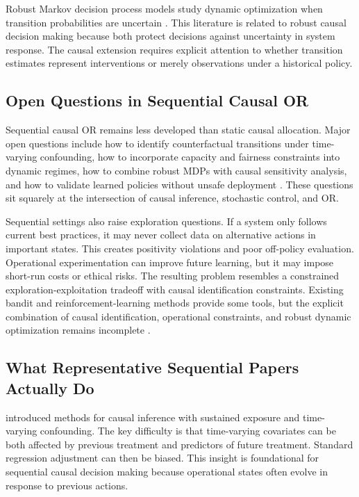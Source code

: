 \documentclass[11pt]{article}
\begin{document}
Robust Markov decision process models study dynamic optimization when transition probabilities are uncertain \citep{iyengar2005robust,nilim2005robust,wiesemann2013robust}. This literature is related to robust causal decision making because both protect decisions against uncertainty in system response. The causal extension requires explicit attention to whether transition estimates represent interventions or merely observations under a historical policy.

\subsection{Open Questions in Sequential Causal OR}

Sequential causal OR remains less developed than static causal allocation. Major open questions include how to identify counterfactual transitions under time-varying confounding, how to incorporate capacity and fairness constraints into dynamic regimes, how to combine robust MDPs with causal sensitivity analysis, and how to validate learned policies without unsafe deployment \citep{robins1986new,murphy2003dynamic,iyengar2005robust,wiesemann2013robust}. These questions sit squarely at the intersection of causal inference, stochastic control, and OR.

Sequential settings also raise exploration questions. If a system only follows current best practices, it may never collect data on alternative actions in important states. This creates positivity violations and poor off-policy evaluation. Operational experimentation can improve future learning, but it may impose short-run costs or ethical risks. The resulting problem resembles a constrained exploration-exploitation tradeoff with causal identification constraints. Existing bandit and reinforcement-learning methods provide some tools, but the explicit combination of causal identification, operational constraints, and robust dynamic optimization remains incomplete \citep{dudik2011doubly,swaminathan2015counterfactual,sutton2018reinforcement}.

\subsection{What Representative Sequential Papers Actually Do}

\citet{robins1986new} introduced methods for causal inference with sustained exposure and time-varying confounding. The key difficulty is that time-varying covariates can be both affected by previous treatment and predictors of future treatment. Standard regression adjustment can then be biased. This insight is foundational for sequential causal decision making because operational states often evolve in response to previous actions.
\end{document}
